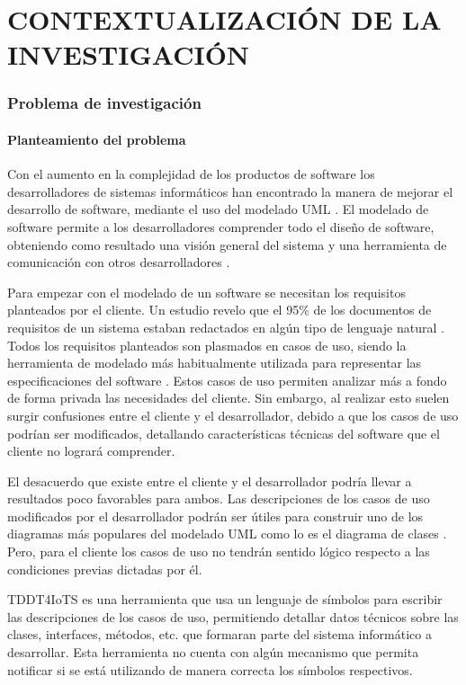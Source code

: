 \setcounter{chapter}{1}
\setcounter{section}{0}
\part{CONTEXTUALIZACIÓN DE LA INVESTIGACIÓN} 

\section{Problema de investigación}

\subsection{Planteamiento del problema}

Con el aumento en la complejidad de los productos de software los desarrolladores de sistemas informáticos han encontrado la manera de mejorar el desarrollo de software, mediante el uso del modelado UML \parencite{Jahan2021}. El modelado de software permite a los desarrolladores comprender todo el diseño de software, obteniendo como resultado una visión general del sistema y una herramienta de comunicación con otros desarrolladores \parencite{gonzalez2022}.

Para empezar con el modelado de un software se necesitan los requisitos planteados por el cliente. Un estudio revelo que el 95\% de los documentos de requisitos de un sistema estaban redactados en algún tipo de lenguaje natural \parencite{Jahan2021}. Todos los requisitos planteados son plasmados en casos de uso, siendo la herramienta de modelado más habitualmente utilizada para representar las especificaciones del software \parencite{hamza2021}. Estos casos de uso permiten analizar más a fondo de forma privada las necesidades del cliente. Sin embargo, al realizar esto suelen surgir confusiones entre el cliente y el desarrollador, debido a que los casos de uso podrían ser modificados, detallando características técnicas del software que el cliente no logrará comprender.

El desacuerdo que existe entre el cliente y el desarrollador podría llevar a resultados poco favorables para ambos. Las descripciones de los casos de uso modificados por el desarrollador podrán ser útiles para construir uno de los diagramas más populares del modelado UML como lo es el diagrama de clases \parencite{Abdelnabi2021}. Pero, para el cliente los casos de uso no tendrán sentido lógico respecto a las condiciones previas dictadas por él.

TDDT4IoTS es una herramienta que usa un lenguaje de símbolos para escribir las descripciones de los casos de uso, permitiendo detallar datos técnicos sobre las clases, interfaces, métodos, etc. que formaran parte del sistema informático a desarrollar. Esta herramienta no cuenta con algún mecanismo que permita notificar si se está utilizando de manera correcta los símbolos respectivos.

